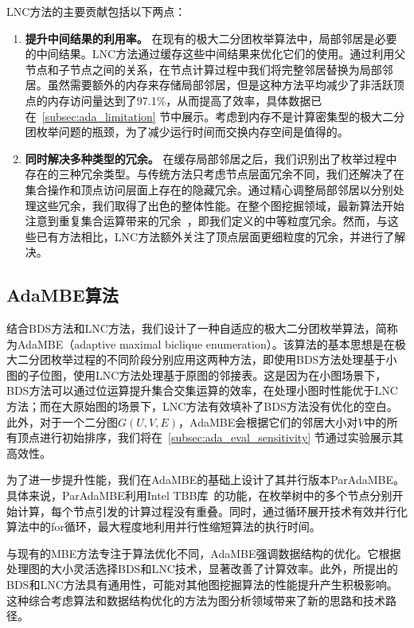 LNC方法的主要贡献包括以下两点：

\begin{enumerate}
  \item \textbf{提升中间结果的利用率。} 在现有的极大二分团枚举算法中，局部邻居是必要的中间结果。LNC方法通过缓存这些中间结果来优化它们的使用。通过利用父节点和子节点之间的关系，在节点计算过程中我们将完整邻居替换为局部邻居。虽然需要额外的内存来存储局部邻居，但是这种方法平均减少了非活跃顶点的内存访问量达到了97.1\%，从而提高了效率，具体数据已在~\ref{subsec:ada_limitation} 节中展示。考虑到内存不是计算密集型的极大二分团枚举问题的瓶颈，为了减少运行时间而交换内存空间是值得的。

\item \textbf{同时解决多种类型的冗余。} 在缓存局部邻居之后，我们识别出了枚举过程中存在的三种冗余类型。与传统方法只考虑节点层面冗余不同，我们还解决了在集合操作和顶点访问层面上存在的隐藏冗余。通过精心调整局部邻居以分别处理这些冗余，我们取得了出色的整体性能。在整个图挖掘领域，最新算法开始注意到重复集合运算带来的冗余~\cite{Graphpi20,GPMredundancy23}，即我们定义的中等粒度冗余。然而，与这些已有方法相比，LNC方法额外关注了顶点层面更细粒度的冗余，并进行了解决。

\end{enumerate}

\subsection{AdaMBE算法}

结合BDS方法和LNC方法，我们设计了一种自适应的极大二分团枚举算法，简称为AdaMBE（adaptive maximal biclique  enumeration）。该算法的基本思想是在极大二分团枚举过程的不同阶段分别应用这两种方法，即使用BDS方法处理基于小图的子位图，使用LNC方法处理基于原图的邻接表。这是因为在小图场景下，BDS方法可以通过位运算提升集合交集运算的效率，在处理小图时性能优于LNC方法；而在大原始图的场景下，LNC方法有效填补了BDS方法没有优化的空白。此外，对于一个二分图$G(U,V,E)$，AdaMBE会根据它们的邻居大小对$V$中的所有顶点进行初始排序，我们将在~\ref{subsec:ada_eval_sensitivity} 节通过实验展示其高效性。


为了进一步提升性能，我们在AdaMBE的基础上设计了其并行版本ParAdaMBE。具体来说，ParAdaMBE利用Intel TBB库~\cite{tbb-code}的功能，在枚举树中的多个节点分别开始计算，每个节点引发的计算过程没有重叠。同时，通过循环展开技术有效并行化算法中的for循环，最大程度地利用并行性缩短算法的执行时间。%

与现有的MBE方法专注于算法优化不同，AdaMBE强调数据结构的优化。它根据处理图的大小灵活选择BDS和LNC技术，显著改善了计算效率。此外，所提出的BDS和LNC方法具有通用性，可能对其他图挖掘算法的性能提升产生积极影响。这种综合考虑算法和数据结构优化的方法为图分析领域带来了新的思路和技术路径。


